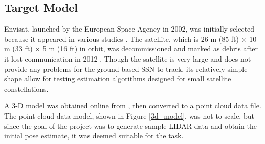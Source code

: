 \documentclass[conference]{IEEEtran}
\begin{document}
	\subsection{Target Model}
		Envisat, launched by the European Space Agency in 2002, was initially selected because it appeared in various studies \cite{NocerinoAlessia2021Lmaf}\cite{unscented_kalman}\cite{2017_pose_pca}\cite{OpromollaRoberto2015Upew}. 
		The satellite, which is 26 m (85 ft) × 10 m (33 ft) × 5 m (16 ft) in orbit, was decommissioned and marked as debris after it lost communication in 2012 \cite{envisat_overview}. Though the satellite is very large and does not provide any problems for the ground based SSN to track, its relatively simple shape allow for testing estimation algorithms designed for small satellite constellations.
		
		A 3-D model was obtained online from \cite{envisat_3d_model}, then converted to a point cloud data file. The point cloud data model, shown in Figure \ref{3d_model}, was not to scale, but since the goal of the project was to generate sample LIDAR data and obtain the initial pose estimate, it was deemed suitable for the task.
\end{document}
